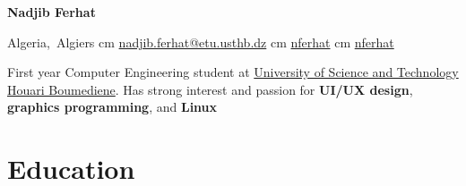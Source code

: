 \documentclass[10pt, letterpaper]{article}
\begin{document}
\placeLastUpdatedText


\newcommand\linkedinProfile{nferhat}
\newcommand\githubProfile{nferhat}
\newcommand\contactEmail{nadjib.ferhat@etu.usthb.dz}

\begin{center}
    \textbf{\fontsize{24 pt}{24 pt}\selectfont Nadjib Ferhat}

    \vspace{0.3 cm}

    \normalsize
    \mbox{{\color{black}\footnotesize\faMapMarker*}\hspace*{0.07cm}Algeria, Algiers}%
     cm%
    \mbox{\href{mailto:\contactEmail}{\color{black}{\footnotesize\faEnvelope[regular]}\hspace*{0.07cm}\contactEmail}}%
     cm%
    \mbox{\href{https://linkedin.com/in/\linkedinProfile}{\color{black}{\footnotesize\faLinkedinIn}\hspace*{0.07cm}\linkedinProfile}}%
     cm%
    \mbox{\href{https://github.com/\githubProfile}{\color{black}{\footnotesize\faGithub}\hspace*{0.07cm}\githubProfile}}%
\end{center}


\begin{onecolentry}
    First year Computer Engineering student at
    \href{https://usthb.dz}{University of Science and Technology Houari
    Boumediene}. Has strong interest and passion for \textbf{UI/UX
    design}, \textbf{graphics programming}, and
    \textbf{Linux}
\end{onecolentry}

\vspace{0.3cm}


\section{Education}
\end{document}
